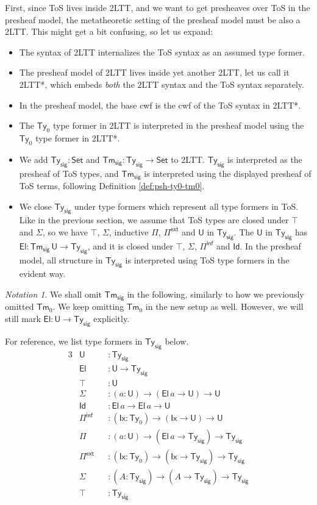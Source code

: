 \documentclass[12pt,a4paper,twoside,openany]{book}
\theoremstyle{remark}
\newtheorem{notation}{Notation}
\theoremstyle{definition}
\theoremstyle{theorem}
\newcommand{\ms}[1]{\mathsf{#1}}
\newcommand{\Tys}{\ms{Ty_{sig}}}
\newcommand{\Tms}{\ms{Tm_{sig}}}
\newcommand{\Tm}{\mathsf{Tm}}
\newcommand{\Ty}{\mathsf{Ty}}
\newcommand{\U}{\mathsf{U}}
\newcommand{\El}{\mathsf{El}}
\newcommand{\Id}{\mathsf{Id}}
\newcommand{\Set}{\mathsf{Set}}
\newcommand{\Pie}{\Pi^{\mathsf{ext}}}
\newcommand{\Piinf}{\Pi^{\mathsf{inf}}}
\begin{document}
First, since ToS lives inside 2LTT, and we want to get presheaves over ToS in
the presheaf model, the metatheoretic setting of the presheaf model must be also
a 2LTT. This might get a bit confusing, so let us expand:
\begin{itemize}
 \item The syntax of 2LTT internalizes the ToS syntax as an assumed type former.
 \item The presheaf model of 2LTT lives inside yet another 2LTT, let us call it 2LTT*,
       which embeds \emph{both} the 2LTT syntax and the ToS syntax separately.
 \item In the presheaf model, the base cwf is the cwf of the ToS syntax in 2LTT*.
 \item The $\Ty_0$ type former in 2LTT is interpreted in the presheaf model using the $\Ty_0$ type former
       in 2LTT*.
 \item We add $\Tys : \Set$ and $\Tms : \Tys \to \Set$ to 2LTT. $\Tys$ is
   interpreted as the presheaf of ToS types, and $\Tms$ is interpreted using the
   displayed presheaf of ToS terms, following Definition \ref{def:psh-ty0-tm0}.
 \item
   We close $\Tys$ under type formers which represent all type formers in ToS.
   Like in the previous section, we assume that ToS types are closed under
   $\top$ and $\Sigma$, so we have $\top$, $\Sigma$, inductive $\Pi$, $\Pie$ and
   $\U$ in $\Tys$.  The $\U$ in $\Tys$ has $\El : \Tms\,\U \to \Tys$, and it is
   closed under $\top$, $\Sigma$, $\Piinf$ and $\Id$. In the presheaf model, all
   structure in $\Tys$ is interpreted using ToS type formers in the evident way.
\end{itemize}

\begin{notation}
We shall omit $\Tms$ in the following, similarly to how we previously omitted
$\Tm_0$. We keep omitting $\Tm_0$ in the new setup as well. However, we
will still mark $\El : \U \to \Tys$ explicitly.
\end{notation}

For reference, we list type formers in $\Tys$ below.
\begingroup
\allowdisplaybreaks
\begin{alignat*}{3}
  & \U               &&: \Tys\\
  & \El              &&: \U \to \Tys\\
  & \top             &&: \U \\
  & \Sigma           &&: (a : \U) \to (\El\,a \to \U) \to \U \\
  & \Id              &&: \El\,a \to \El\,a \to \U \\
  & \Piinf           &&: (\ms{Ix} : \Ty_0) \to (\ms{Ix} \to \U) \to \U\\
  & \Pi              &&: (a : \U) \to (\El\,a \to \Tys) \to \Tys\\
  & \Pie             &&: (\ms{Ix} : \Ty_0) \to (\ms{Ix} \to \Tys) \to \Tys\\
  & \Sigma           &&: (A : \Tys) \to (A \to \Tys) \to \Tys\\
  & \top             &&: \Tys
\end{alignat*}
\endgroup
\end{document}
